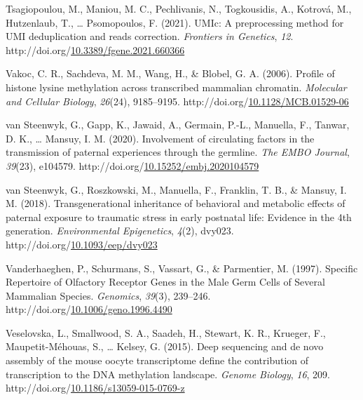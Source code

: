 \documentclass[12pt,twoside]{reedthesis}
\newlength{\cslhangindent}
\newenvironment{CSLReferences}[2] %
 {%
  \setlength{\parindent}{0pt}
  \ifodd #1 \everypar{\setlength{\hangindent}{\cslhangindent}}\ignorespaces\fi
  \ifnum #2 > 0
  \setlength{\parskip}{#2\baselineskip}
  \fi
 }%
 {}
\begin{document}
\begin{CSLReferences}{1}{0}
\leavevmode{}%
Tsagiopoulou, M., Maniou, M. C., Pechlivanis, N., Togkousidis, A., Kotrová, M., Hutzenlaub, T., \ldots{} Psomopoulos, F. (2021). UMIc: A preprocessing method for UMI deduplication and reads correction. \emph{Frontiers in Genetics}, \emph{12}. http://doi.org/\href{https://doi.org/10.3389/fgene.2021.660366}{10.3389/fgene.2021.660366}

\leavevmode{}%
Vakoc, C. R., Sachdeva, M. M., Wang, H., \& Blobel, G. A. (2006). Profile of histone lysine methylation across transcribed mammalian chromatin. \emph{Molecular and Cellular Biology}, \emph{26}(24), 9185--9195. http://doi.org/\href{https://doi.org/10.1128/MCB.01529-06}{10.1128/MCB.01529-06}

\leavevmode{}%
van Steenwyk, G., Gapp, K., Jawaid, A., Germain, P.-L., Manuella, F., Tanwar, D. K., \ldots{} Mansuy, I. M. (2020). Involvement of circulating factors in the transmission of paternal experiences through the germline. \emph{The EMBO Journal}, \emph{39}(23), e104579. http://doi.org/\href{https://doi.org/10.15252/embj.2020104579}{10.15252/embj.2020104579}

\leavevmode{}%
van Steenwyk, G., Roszkowski, M., Manuella, F., Franklin, T. B., \& Mansuy, I. M. (2018). Transgenerational inheritance of behavioral and metabolic effects of paternal exposure to traumatic stress in early postnatal life: Evidence in the 4th generation. \emph{Environmental Epigenetics}, \emph{4}(2), dvy023. http://doi.org/\href{https://doi.org/10.1093/eep/dvy023}{10.1093/eep/dvy023}

\leavevmode{}%
Vanderhaeghen, P., Schurmans, S., Vassart, G., \& Parmentier, M. (1997). Specific Repertoire of Olfactory Receptor Genes in the Male Germ Cells of Several Mammalian Species. \emph{Genomics}, \emph{39}(3), 239--246. http://doi.org/\href{https://doi.org/10.1006/geno.1996.4490}{10.1006/geno.1996.4490}

\leavevmode{}%
Veselovska, L., Smallwood, S. A., Saadeh, H., Stewart, K. R., Krueger, F., Maupetit-Méhouas, S., \ldots{} Kelsey, G. (2015). Deep sequencing and de novo assembly of the mouse oocyte transcriptome define the contribution of transcription to the DNA methylation landscape. \emph{Genome Biology}, \emph{16}, 209. http://doi.org/\href{https://doi.org/10.1186/s13059-015-0769-z}{10.1186/s13059-015-0769-z}


\end{CSLReferences}
\end{document}
